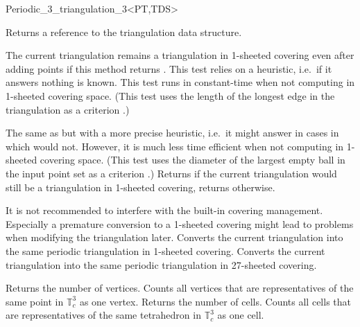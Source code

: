 \begin{ccRefClass}{Periodic_3_triangulation_3<PT,TDS>}
\begin{ccAdvanced}
{Returns a reference to the triangulation data structure.}

{The current triangulation remains a triangulation in 1-sheeted
  covering even after adding points if this method returns
  . This test relies on a heuristic, i.e.\ if it answers
   nothing is known. This test runs in constant-time when
  not computing in 1-sheeted covering space. (This test uses the length
of the longest edge in the triangulation as a
criterion \cite{cgal:ct-c3dpt-09}.)}

{The same as  but with
a more precise heuristic, i.e.\ it might answer  in cases in which
 would not. However, it is
much less time efficient when not computing in 1-sheeted covering
space. (This test uses the diameter of the largest empty ball in the
input point set as a criterion \cite{cgal:ct-c3dpt-09}.)}
\ccGlue
{}
{Returns  if the current triangulation would still be a
  triangulation in 1-sheeted covering, returns  otherwise.}

It is not recommended to interfere with the built-in covering
management. Especially a premature conversion to a 1-sheeted covering
might lead to problems when modifying the triangulation later.
{Converts the current triangulation into the same periodic
  triangulation in 1-sheeted covering.}
\ccGlue
{}
{Converts the current triangulation into the same periodic
  triangulation in 27-sheeted covering.}

\end{ccAdvanced}


{Returns the number of vertices. Counts all vertices that are
  representatives of the same point in $\mathbb T_c^3$ as one vertex.}
\ccGlue
{}
{Returns the number of cells. Counts all cells that are
  representatives of the same tetrahedron in $\mathbb T_c^3$ as one
  cell.}


\end{ccRefClass}
